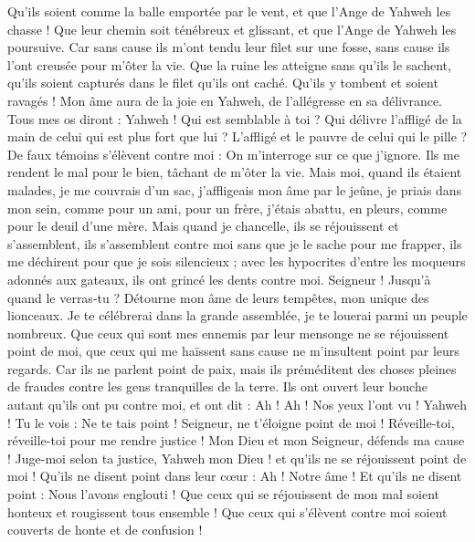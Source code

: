 \begin{multicols}{2}
Qu'ils soient comme la balle emportée par le vent, et que l'Ange de Yahweh les chasse !
Que leur chemin soit ténébreux et glissant, et que l'Ange de Yahweh les poursuive.
Car sans cause ils m'ont tendu leur filet sur une fosse, sans cause ils l'ont creusée pour m'ôter la vie.
Que la ruine les atteigne sans qu'ils le sachent, qu'ils soient capturés dans le filet qu'ils ont caché. Qu'ils y tombent et soient ravagés !
Mon âme aura de la joie en Yahweh, de l'allégresse en sa délivrance.
Tous mes os diront : Yahweh ! Qui est semblable à toi ? Qui délivre l'affligé de la main de celui qui est plus fort que lui ? L'affligé et le pauvre de celui qui le pille ?
De faux témoins s'élèvent contre moi : On m'interroge sur ce que j'ignore.
Ils me rendent le mal pour le bien, tâchant de m'ôter la vie.
Mais moi, quand ils étaient malades, je me couvrais d'un sac, j'affligeais mon âme par le jeûne, je priais dans mon sein,
comme pour un ami, pour un frère, j'étais abattu, en pleurs, comme pour le deuil d'une mère.
Mais quand je chancelle, ils se réjouissent et s'assemblent, ils s'assemblent contre moi sans que je le sache pour me frapper, ils me déchirent pour que je sois silencieux ;
avec les hypocrites d'entre les moqueurs adonnés aux gateaux, ils ont grincé les dents contre moi.
Seigneur ! Jusqu'à quand le verras-tu ? Détourne mon âme de leurs tempêtes, mon unique des lionceaux.
Je te célébrerai dans la grande assemblée, je te louerai parmi un peuple nombreux.
Que ceux qui sont mes ennemis par leur mensonge ne se réjouissent point de moi, que ceux qui me haïssent sans cause ne m'insultent point par leurs regards.
Car ils ne parlent point de paix, mais ils préméditent des choses pleines de fraudes contre les gens tranquilles de la terre.
Ils ont ouvert leur bouche autant qu'ils ont pu contre moi, et ont dit : Ah ! Ah ! Nos yeux l'ont vu !
Yahweh ! Tu le vois : Ne te tais point ! Seigneur, ne t'éloigne point de moi !
Réveille-toi, réveille-toi pour me rendre justice ! Mon Dieu et mon Seigneur, défends ma cause !
Juge-moi selon ta justice, Yahweh mon Dieu ! et qu'ils ne se réjouissent point de moi !
Qu'ils ne disent point dans leur cœur : Ah ! Notre âme ! Et qu'ils ne disent point : Nous l'avons englouti !
Que ceux qui se réjouissent de mon mal soient honteux et rougissent tous ensemble ! Que ceux qui s'élèvent contre moi soient couverts de honte et de confusion !

\end{multicols}
